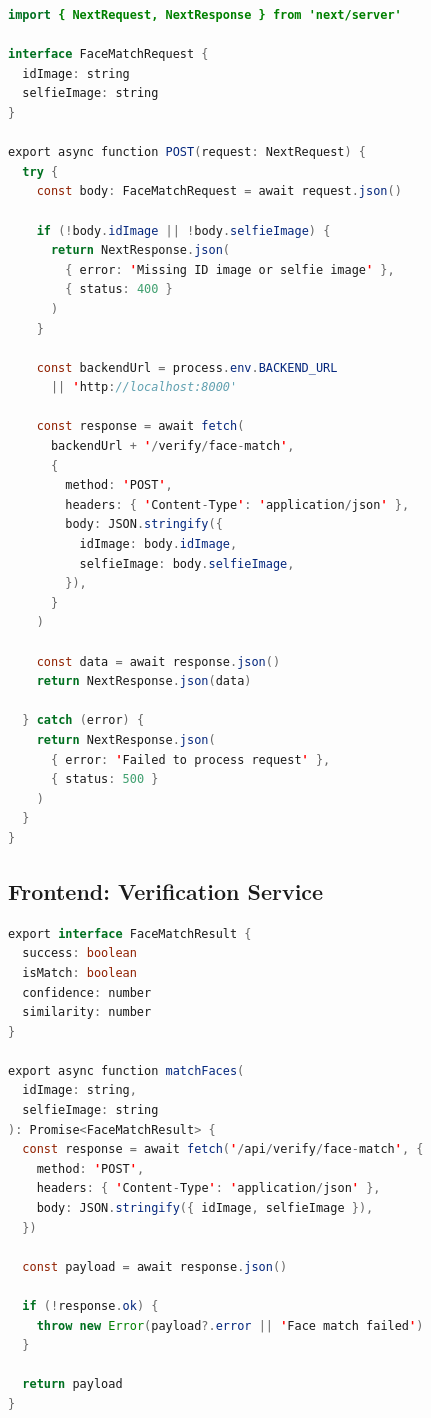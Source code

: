 \documentclass[12pt,a4paper]{article}
\begin{document}
\begin{lstlisting}[language=Java, caption={Next.js API Route (face-match/route.ts)}]
import { NextRequest, NextResponse } from 'next/server'

interface FaceMatchRequest {
  idImage: string
  selfieImage: string
}

export async function POST(request: NextRequest) {
  try {
    const body: FaceMatchRequest = await request.json()

    if (!body.idImage || !body.selfieImage) {
      return NextResponse.json(
        { error: 'Missing ID image or selfie image' },
        { status: 400 }
      )
    }

    const backendUrl = process.env.BACKEND_URL 
      || 'http://localhost:8000'
    
    const response = await fetch(
      backendUrl + '/verify/face-match',
      {
        method: 'POST',
        headers: { 'Content-Type': 'application/json' },
        body: JSON.stringify({
          idImage: body.idImage,
          selfieImage: body.selfieImage,
        }),
      }
    )

    const data = await response.json()
    return NextResponse.json(data)
    
  } catch (error) {
    return NextResponse.json(
      { error: 'Failed to process request' },
      { status: 500 }
    )
  }
}
\end{lstlisting}

\subsection{Frontend: Verification Service}

\begin{lstlisting}[language=Java, caption={verification-service.ts}]
export interface FaceMatchResult {
  success: boolean
  isMatch: boolean
  confidence: number
  similarity: number
}

export async function matchFaces(
  idImage: string, 
  selfieImage: string
): Promise<FaceMatchResult> {
  const response = await fetch('/api/verify/face-match', {
    method: 'POST',
    headers: { 'Content-Type': 'application/json' },
    body: JSON.stringify({ idImage, selfieImage }),
  })

  const payload = await response.json()
  
  if (!response.ok) {
    throw new Error(payload?.error || 'Face match failed')
  }

  return payload
}
\end{lstlisting}
\end{document}
